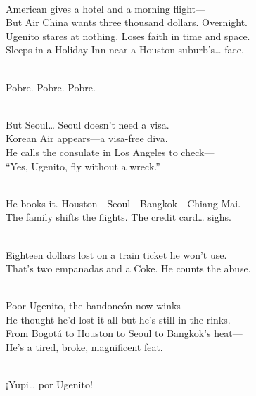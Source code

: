 \begin{lyrics}


\\
American gives a hotel and a morning flight—\\
But Air China wants three thousand dollars. %
Overnight.\\
Ugenito stares at nothing. %
Loses faith in time and space.\\
Sleeps in a Holiday Inn near a Houston suburb’s… face.

\\
Pobre. Pobre. Pobre.


\\
But Seoul… Seoul doesn’t need a visa.\\
Korean Air appears—a visa-free diva.\\
He calls the consulate in Los Angeles to check—\\
“Yes, Ugenito, fly without a wreck.”

\\
He books it. %
Houston—Seoul—Bangkok—Chiang Mai.\\
The family shifts the flights. %
The credit card… sighs.


\\
Eighteen dollars lost on a train ticket he won’t use.\\
That’s two empanadas and a Coke. %
He counts the abuse.


\\
Poor Ugenito, the bandoneón now winks—\\
He thought he’d lost it all but he’s still in the rinks.\\
From Bogotá to Houston to Seoul to Bangkok’s heat—\\
He’s a tired, broke, magnificent feat.

\\
¡Yupi… por Ugenito!



\end{lyrics}
